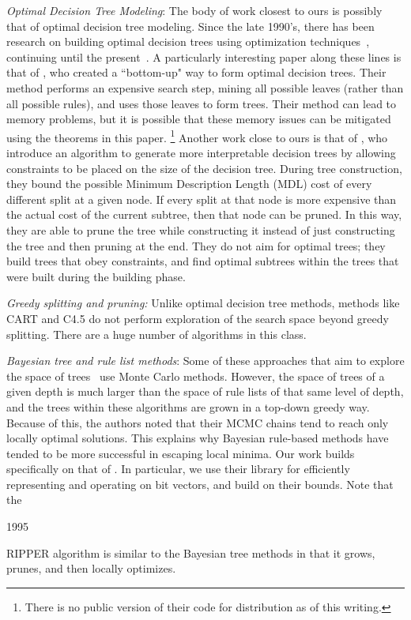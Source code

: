 \textit{Optimal Decision Tree Modeling}: The body of work closest to ours is possibly that of optimal decision tree modeling.
%
Since the late 1990's, there has been research on building optimal decision trees
using optimization techniques~\citep{Bennett96optimaldecision,dobkininduction},
continuing until the present~\citep{FarhangfarGZ08}.
%
A particularly interesting paper along these lines is that of \citet{NijssenFromont2010}, who created a ``bottom-up" way to form optimal decision trees. Their method performs an expensive search step, mining all possible leaves (rather than all possible rules), and uses those leaves to form trees. Their method can lead to memory problems, but it is possible that these memory issues can be mitigated using the theorems in this paper. \footnote{There is no public version of their code for distribution as of this writing.} Another work close to ours is that of \citet{GarofalakisHyRaSh00}, who introduce an algorithm to generate more interpretable decision trees by allowing constraints to be placed on the size of the decision tree. During tree construction, they bound the possible Minimum Description Length (MDL) cost of every different split at a given node. If every split at that node is more expensive than the actual cost of the current subtree, then that node can be pruned. In this way, they are able to prune the tree while constructing it instead of just constructing the tree and then pruning at the end. They do not aim for optimal trees; they build trees that obey constraints, and find optimal subtrees within the trees that were built during the building phase.

\textit{Greedy splitting and pruning:} Unlike optimal decision tree methods, methods like
CART \citep{Breiman84} and C4.5 \citep{Quinlan93} do not perform exploration of the search space beyond greedy splitting. There are a huge number of algorithms in this class.

\textit{Bayesian tree and rule list methods}: Some of these approaches that aim to explore
the space of trees~\citep{Dension:1998hl,Chipman:2002hc,Chipman10} use Monte Carlo methods.
%
However, the space of trees of a given depth is much larger than the space of
rule lists of that same level of depth, and the trees within these algorithms
are grown in a top-down greedy way.
%
Because of this, the authors noted that their MCMC chains tend to reach only
locally optimal solutions.
%
This explains why Bayesian rule-based methods \citep{LethamRuMcMa15,YangRuSe16} have tended to be more successful in escaping local minima.
%
Our work builds specifically on that of \citet{YangRuSe16}.
%
In particular, we use their library for efficiently representing and
operating on bit vectors, and build on their bounds.
%
Note that the
\begin{kdd}
1995
\end{kdd}
RIPPER algorithm \citep{ripper} is similar to the Bayesian tree methods in that it grows, prunes, and then locally optimizes.

